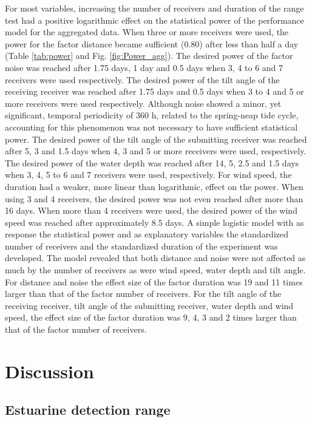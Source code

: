 \documentclass[doublespacing,linenumbers]{bmcart}
\begin{document}
For most variables, increasing the number of receivers and duration of the range test had a positive logarithmic effect on the statistical power of the performance model for the aggregated data. When three or more receivers were used, the power for the factor distance became sufficient (0.80) after less than half a day (Table \ref{tab:power} and Fig. \ref{fig:Power_agg}). The desired power of the factor noise was reached after 1.75 days, 1 day and 0.5 days when 3, 4 to 6 and 7 receivers were used respectively. The desired power of the tilt angle of the receiving receiver was reached after 1.75 days and 0.5 days when 3 to 4 and 5 or more receivers were used respectively. Although noise showed a minor, yet significant, temporal periodicity of 360 h, related to the spring-neap tide cycle, accounting for this phenomenon was not necessary to have sufficient statistical power. The desired power of the tilt angle of the submitting receiver was reached after 5, 3 and 1.5 days when 4, 3 and 5 or more receivers were used, respectively. The desired power of the water depth was reached after 14, 5, 2.5 and 1.5 days when 3, 4, 5 to 6 and 7 receivers were used, respectively. For wind speed, the duration had a weaker, more linear than logarithmic, effect on the power. When using 3 and 4 receivers, the desired power was not even reached after more than 16 days. When more than 4 receivers were used, the desired power of the wind speed was reached after approximately 8.5 days. A simple logistic model with as response the statistical power and as explanatory variables the standardized number of receivers and the standardized duration of the experiment was developed. The model revealed that both distance and noise were not affected as much by the number of receivers as were wind speed, water depth and tilt angle. For distance and noise the effect size of the factor duration was 19 and 11 times larger than that of the factor number of receivers. For the tilt angle of the receiving receiver, tilt angle of the submitting receiver, water depth and wind speed, the effect size of the factor duration was 9, 4, 3 and 2 times larger than that of the factor number of receivers. 

\section*{Discussion}

\subsection*{Estuarine detection range}
\end{document}
